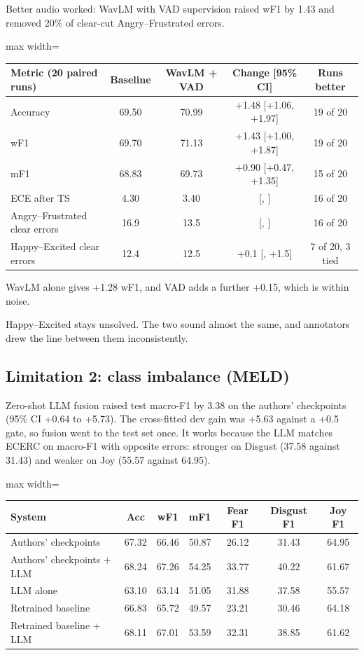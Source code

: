 \documentclass[11pt,a4paper]{article}
\newcommand{\mn}{\textminus}
\begin{document}
Better audio worked: WavLM with VAD supervision raised wF1 by 1.43 and removed 20\% of clear-cut Angry--Frustrated errors.

\begin{center}
\begin{adjustbox}{max width=\linewidth}
\begin{tabular}{lcccc}
\toprule
Metric (20 paired runs) & Baseline & WavLM + VAD & Change [95\% CI] & Runs better \\
\midrule
Accuracy & 69.50 & 70.99 & +1.48 [+1.06, +1.97] & 19 of 20 \\
wF1 & 69.70 & 71.13 & +1.43 [+1.00, +1.87] & 19 of 20 \\
mF1 & 68.83 & 69.73 & +0.90 [+0.47, +1.35] & 15 of 20 \\
ECE after TS & 4.30 & 3.40 & \mn0.90 [\mn1.33, \mn0.47] & 16 of 20 \\
Angry--Frustrated clear errors & 16.9 & 13.5 & \mn3.4 [\mn5.1, \mn1.7] & 16 of 20 \\
Happy--Excited clear errors & 12.4 & 12.5 & +0.1 [\mn1.2, +1.5] & 7 of 20, 3 tied \\
\bottomrule
\end{tabular}
\end{adjustbox}
\end{center}

WavLM alone gives +1.28 wF1, and VAD adds a further +0.15, which is within noise.

Happy--Excited stays unsolved. The two sound almost the same, and annotators drew the line between them inconsistently.

\subsection{Limitation 2: class imbalance (MELD)}

Zero-shot LLM fusion raised test macro-F1 by 3.38 on the authors' checkpoints (95\% CI +0.64 to +5.73). The cross-fitted dev gain was +5.63 against a +0.5 gate, so fusion went to the test set once. It works because the LLM matches ECERC on macro-F1 with opposite errors: stronger on Disgust (37.58 against 31.43) and weaker on Joy (55.57 against 64.95).

\begin{center}
\begin{adjustbox}{max width=\linewidth}
\begin{tabular}{lcccccc}
\toprule
System & Acc & wF1 & mF1 & Fear F1 & Disgust F1 & Joy F1 \\
\midrule
Authors' checkpoints & 67.32 & 66.46 & 50.87 & 26.12 & 31.43 & 64.95 \\
Authors' checkpoints + LLM & 68.24 & 67.26 & 54.25 & 33.77 & 40.22 & 61.67 \\
LLM alone & 63.10 & 63.14 & 51.05 & 31.88 & 37.58 & 55.57 \\
Retrained baseline & 66.83 & 65.72 & 49.57 & 23.21 & 30.46 & 64.18 \\
Retrained baseline + LLM & 68.11 & 67.01 & 53.59 & 32.31 & 38.85 & 61.62 \\
\bottomrule
\end{tabular}
\end{adjustbox}
\end{center}
\end{document}
